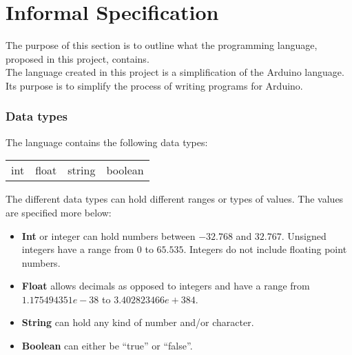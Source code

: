 \chapter{Informal Specification}\label{analysis:informal-specification}
The purpose of this section is to outline what the programming language, proposed in this project, contains.
\\The language created in this project is a simplification of the Arduino language. Its purpose is to simplify the process of writing programs for Arduino.   

\subsection{Data types}
The language contains the following data types: \\ 
\begin{center}
\begin{tabular}{ l l l l}
int & float & string & boolean \\
\end{tabular}
\end{center}

The different data types can hold different ranges or types of values. The values are specified more below: 
\begin{itemize}
\item \textbf{Int} or integer can hold numbers between $-32.768$ and $32.767$. Unsigned integers have a range from $0$ to $65.535$. Integers do not include floating point numbers. 
\item \textbf{Float} allows decimals as opposed to integers and have a range from $1.175494351e-38$ to $3.402823466e+384$.
\item \textbf{String} can hold any kind of number and/or character. 
\item \textbf{Boolean} can either be ``true'' or ``false''. 
\end{itemize}

